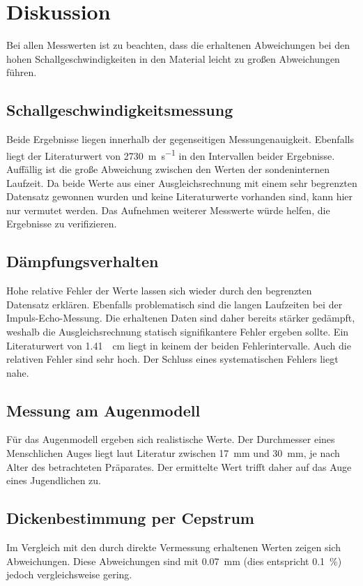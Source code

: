 \documentclass[
  bibliography=totoc,     %
  captions=tableheading,  %
  titlepage=firstiscover, %
]{scrartcl}
\begin{document}
\section{Diskussion}
Bei allen Messwerten ist zu beachten, dass die erhaltenen Abweichungen bei den
hohen Schallgeschwindigkeiten in den Material leicht zu großen Abweichungen führen.
\subsection{Schallgeschwindigkeitsmessung}
Beide Ergebnisse liegen innerhalb der gegenseitigen Messungenauigkeit. Ebenfalls liegt
der Literaturwert\cite{acryl} von \SI{2730}{\metre\per\second} in den Intervallen
beider Ergebnisse. Auffällig ist die große Abweichung zwischen den Werten der sondeninternen
Laufzeit. Da beide Werte aus einer Ausgleichsrechnung mit einem sehr
begrenzten Datensatz gewonnen wurden und keine Literaturwerte vorhanden sind, kann hier nur
vermutet werden. Das Aufnehmen weiterer Messwerte würde helfen, die Ergebnisse zu verifizieren.
\subsection{Dämpfungsverhalten}
Hohe relative Fehler der Werte lassen sich wieder durch den begrenzten Datensatz
erklären. Ebenfalls problematisch sind die langen Laufzeiten bei der Impuls-Echo-Messung.
Die erhaltenen Daten sind daher bereits stärker gedämpft, weshalb die Ausgleichsrechnung
statisch signifikantere Fehler ergeben sollte. Ein Literaturwert\cite{daempf} von \SI{1.41}{\per\centi\metre}
liegt in keinem der beiden Fehlerintervalle. Auch die relativen Fehler sind sehr hoch. Der Schluss eines
systematischen Fehlers liegt nahe.
\subsection{Messung am Augenmodell}
Für das Augenmodell ergeben sich realistische Werte. Der Durchmesser eines Menschlichen
Auges liegt laut Literatur\cite{auge} zwischen \SI{17}{\milli\metre} und \SI{30}{\milli\metre},
je nach Alter des betrachteten Präparates. Der ermittelte Wert trifft daher auf das Auge eines
Jugendlichen zu.
\subsection{Dickenbestimmung per Cepstrum}
Im Vergleich mit den durch direkte Vermessung erhaltenen Werten zeigen sich Abweichungen.
Diese
Abweichungen sind mit \SI{0.07}{\milli\metre} (dies entspricht \SI{0.1}{\percent}) jedoch
vergleichsweise gering.

\newpage
\nocite{*}
\printbibliography
\end{document}
